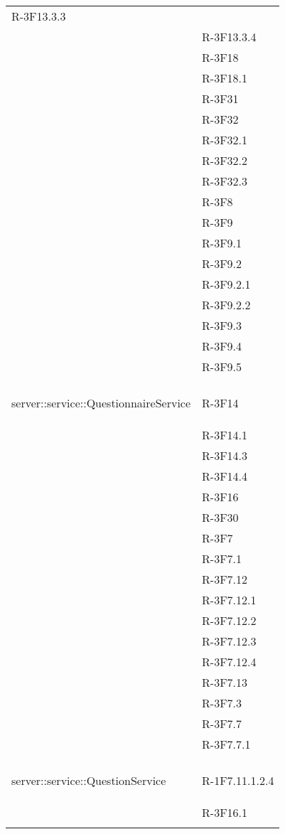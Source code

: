 \begin{longtable}{l p{3cm}}
R-3F13.3.3 \tabularnewline &

R-3F13.3.4 \tabularnewline &

R-3F18 \tabularnewline &

R-3F18.1 \tabularnewline &

R-3F31 \tabularnewline &

R-3F32 \tabularnewline &

R-3F32.1 \tabularnewline &

R-3F32.2 \tabularnewline &

R-3F32.3 \tabularnewline &

R-3F8 \tabularnewline &

R-3F9 \tabularnewline &

R-3F9.1 \tabularnewline &

R-3F9.2 \tabularnewline &

R-3F9.2.1 \tabularnewline &

R-3F9.2.2 \tabularnewline &

R-3F9.3 \tabularnewline &

R-3F9.4 \tabularnewline &

R-3F9.5 \tabularnewline &\tabularnewline
\midrule
\hypertarget{server::service::QuestionnaireService}{server::service::QuestionnaireService} & R-3F14 \tabularnewline &

R-3F14.1 \tabularnewline &

R-3F14.3 \tabularnewline &

R-3F14.4 \tabularnewline &

R-3F16 \tabularnewline &

R-3F30 \tabularnewline &

R-3F7 \tabularnewline &

R-3F7.1 \tabularnewline &

R-3F7.12 \tabularnewline &

R-3F7.12.1 \tabularnewline &

R-3F7.12.2 \tabularnewline &

R-3F7.12.3 \tabularnewline &

R-3F7.12.4 \tabularnewline &

R-3F7.13 \tabularnewline &

R-3F7.3 \tabularnewline &

R-3F7.7 \tabularnewline &

R-3F7.7.1 \tabularnewline &\tabularnewline
\midrule
\hypertarget{server::service::QuestionService}{server::service::QuestionService} & R-1F7.11.1.2.4 \tabularnewline &

R-3F16.1 \tabularnewline &


\end{longtable}

